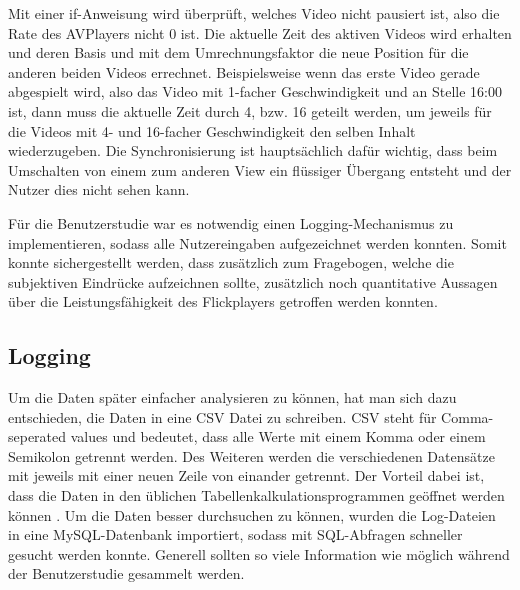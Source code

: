 \documentclass[11pt,a4paper]{report}
\begin{document}
Mit einer if-Anweisung wird überprüft, welches Video nicht pausiert ist, also die Rate des AVPlayers nicht 0 ist. Die aktuelle Zeit des aktiven Videos wird erhalten und deren Basis und mit dem Umrechnungsfaktor die neue Position für die anderen beiden Videos errechnet. Beispielsweise wenn das erste Video gerade abgespielt wird, also das Video mit 1-facher Geschwindigkeit und an Stelle 16:00 ist, dann muss die aktuelle Zeit durch 4, bzw. 16 geteilt werden, um jeweils für die Videos mit 4- und 16-facher Geschwindigkeit den selben Inhalt wiederzugeben. Die Synchronisierung ist hauptsächlich dafür wichtig, dass beim Umschalten von einem zum anderen View ein flüssiger Übergang entsteht und der Nutzer dies nicht sehen kann.

Für die Benutzerstudie war es notwendig einen Logging-Mechanismus zu implementieren, sodass alle Nutzereingaben aufgezeichnet werden konnten. Somit konnte sichergestellt werden, dass zusätzlich zum Fragebogen, welche die subjektiven Eindrücke aufzeichnen sollte, zusätzlich noch quantitative Aussagen über die Leistungsfähigkeit des Flickplayers getroffen werden konnten.

\subsection{Logging}

Um die Daten später einfacher analysieren zu können, hat man sich dazu entschieden, die Daten in eine CSV Datei zu schreiben. CSV steht für Comma-seperated values und bedeutet, dass alle Werte mit einem Komma oder einem Semikolon getrennt werden. Des Weiteren werden die verschiedenen Datensätze mit jeweils mit einer neuen Zeile von einander getrennt. Der Vorteil dabei ist, dass die Daten in den üblichen Tabellenkalkulationsprogrammen geöffnet werden können \cite{louis2007java}. Um die Daten besser durchsuchen zu können, wurden die Log-Dateien in eine MySQL-Datenbank importiert, sodass mit SQL-Abfragen schneller gesucht werden konnte. Generell sollten so viele Information wie möglich während der Benutzerstudie gesammelt werden.
\end{document}
